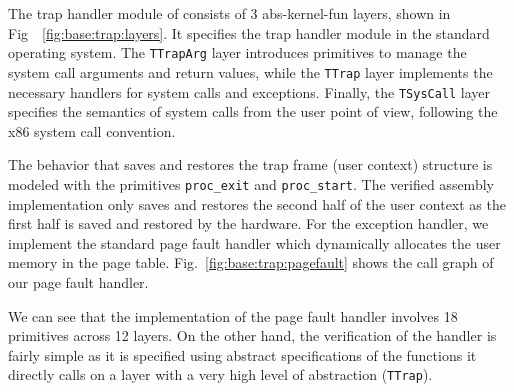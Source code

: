 The trap handler module of \mCTOSbase{} consists of 3 abs-kernel-fun
layers, shown in Fig\ ~\ref{fig:base:trap:layers}.  It specifies the
trap handler module in the standard operating system.  The
\verb"TTrapArg" layer introduces primitives to manage the system call
arguments and return values, while the \verb"TTrap" layer implements
the necessary handlers for system calls and exceptions.  Finally, the
\verb"TSysCall" layer specifies the semantics of system calls from the
user point of view, following the x86 system call convention.

The behavior that saves and restores the trap frame (user context)
structure is modeled with the primitives \verb"proc_exit" and
\verb"proc_start".  The verified assembly implementation only saves
and restores the second half of the user context as the first half is
saved and restored by the hardware.  For the exception handler, we
implement the standard page fault handler which dynamically allocates
the user memory in the page table.  Fig.~\ref{fig:base:trap:pagefault}
shows the call graph of our page fault handler. 
We can see that the
implementation of the page fault handler involves 18 primitives across
12 layers.  On the other hand, the verification of the handler is
fairly simple as it is specified using abstract specifications of the
functions it directly calls on a layer with a very high level of
abstraction (\verb"TTrap").


